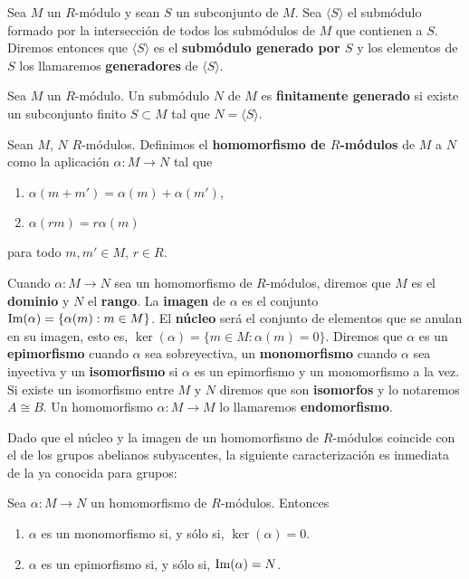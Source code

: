 \begin{definicion}
	Sea \(M\) un \(R\)-módulo y sean \(S\) un subconjunto de \(M\). Sea
	\(\langle S \rangle\) el submódulo formado por la intersección de todos los
	submódulos de \(M\) que contienen a \(S\). Diremos entonces que \(\langle S \rangle\)
	es el \textbf{submódulo generado por \(S\)} y los elementos de $S$ los llamaremos \textbf{generadores} de \(\langle S \rangle\).
\end{definicion}

\begin{definicion}
	Sea \(M\) un \(R\)-módulo. Un submódulo \(N\) de \(M\) es \textbf{finitamente generado}
	si existe un subconjunto finito \(S \subset M\) tal que \(N = \langle S \rangle\).
\end{definicion}

\begin{definicion}
	Sean \(M\), \(N\) \(R\)-módulos. Definimos el \textbf{homomorfismo de \(R\)-módulos}
	de \(M\) a \(N\) como la aplicación \(\alpha: M \rightarrow N\) tal que
	\begin{enumerate}
		\item \(\alpha(m+m') = \alpha(m) + \alpha(m')\),
		
		\item \(\alpha(rm) = r\alpha(m)\)
	\end{enumerate}
	para todo \(m,m' \in M\), \(r \in R\).
\end{definicion}

Cuando \(\alpha: M \rightarrow N\) sea un homomorfismo de \(R\)-módulos, diremos que
\(M\) es el \textbf{dominio} y \(N\) el \textbf{rango}. La \textbf{imagen} de
\(\alpha\) es el conjunto \(\operatorname{Im}(\alpha) = \{ \alpha(m) : m \in M \}\). El \textbf{núcleo}
será el conjunto de elementos que se anulan en su imagen, esto es,
\(\ker(\alpha) = \{ m \in M : \alpha(m) = 0 \}\). Diremos que \(\alpha\) es un \textbf{epimorfismo}
cuando \(\alpha\) sea sobreyectiva, un \textbf{monomorfismo} cuando \(\alpha\) sea
inyectiva y un \textbf{isomorfismo} si \(\alpha\) es un epimorfismo y un monomorfismo
a la vez. Si existe un isomorfismo entre \(M\) y \(N\) diremos que son \textbf{isomorfos}
y lo notaremos \(A \cong B\). Un homomorfismo \(\alpha: M \rightarrow M\) lo
llamaremos \textbf{endomorfismo}.

Dado que el núcleo y la imagen de un homomorfismo de \(R\)-módulos coincide con el
de los grupos abelianos subyacentes, la siguiente caracterización es inmediata
de la ya conocida para grupos:

\begin{proposicion}
	Sea \(\alpha: M \to N\) un homomorfismo de \(R\)-módulos. Entonces
	\begin{enumerate}
		\item \(\alpha\) es un monomorfismo si, y sólo si, \(\ker(\alpha) = 0\).
		
		\item \(\alpha\) es un epimorfismo si, y sólo si, \(\operatorname{Im}(\alpha) = N\).
	\end{enumerate}
\end{proposicion}

